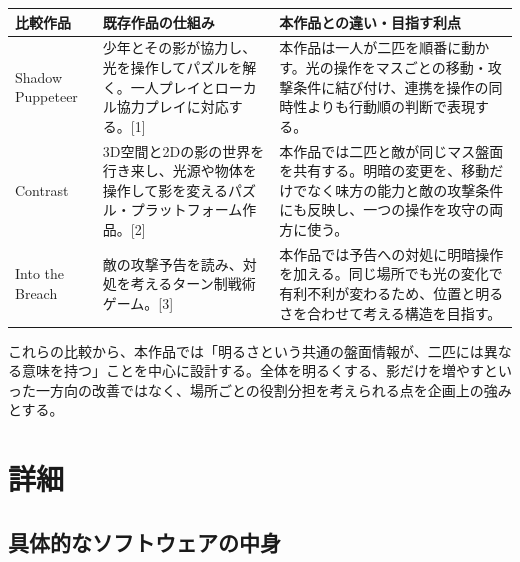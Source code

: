\documentclass[a4paper,11pt,dvipdfmx]{jsarticle}
\begin{document}
{\small
\begin{longtable}{@{}P{0.20\dimexpr{}\tabcolsep\relax}P{0.34\dimexpr{}\tabcolsep\relax}P{0.46\dimexpr{}\tabcolsep\relax}@{}}
\toprule
\textbf{比較作品} & \textbf{既存作品の仕組み} & \textbf{本作品との違い・目指す利点} \\
\midrule
\endhead
Shadow Puppeteer & 少年とその影が協力し、光を操作してパズルを解く。一人プレイとローカル協力プレイに対応する。[1] & 本作品は一人が二匹を順番に動かす。光の操作をマスごとの移動・攻撃条件に結び付け、連携を操作の同時性よりも行動順の判断で表現する。 \\
Contrast & 3D空間と2Dの影の世界を行き来し、光源や物体を操作して影を変えるパズル・プラットフォーム作品。[2] & 本作品では二匹と敵が同じマス盤面を共有する。明暗の変更を、移動だけでなく味方の能力と敵の攻撃条件にも反映し、一つの操作を攻守の両方に使う。 \\
Into the Breach & 敵の攻撃予告を読み、対処を考えるターン制戦術ゲーム。[3] & 本作品では予告への対処に明暗操作を加える。同じ場所でも光の変化で有利不利が変わるため、位置と明るさを合わせて考える構造を目指す。 \\
\bottomrule
\end{longtable}
}

これらの比較から、本作品では「明るさという共通の盤面情報が、二匹には異なる意味を持つ」ことを中心に設計する。全体を明るくする、影だけを増やすといった一方向の改善ではなく、場所ごとの役割分担を考えられる点を企画上の強みとする。

\section{詳細}

\subsection{具体的なソフトウェアの中身}
\end{document}
